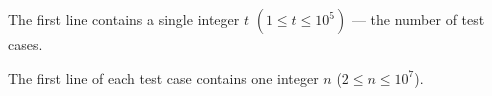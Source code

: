The first line contains a single integer $t$ $(1 \le t \le 10^5)$ --- the number of test cases.

The first line of each test case contains one integer $n$ ($2 \le n \le 10^7$).
